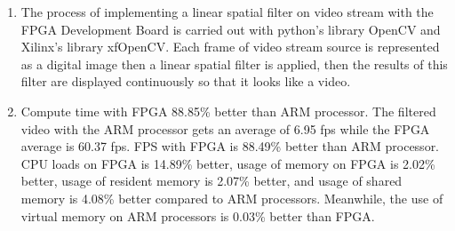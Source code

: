 \begin{enumerate}[topsep=0pt,itemsep=0pt,partopsep=0pt, parsep=0pt]

    \item The process of implementing a linear spatial filter on video stream with the FPGA Development Board is carried out with python's library OpenCV and Xilinx's library xfOpenCV. Each frame of video stream source is represented as a digital image then a linear spatial filter is applied, then the results of this filter are displayed continuously so that it looks like a video.


    \item Compute time with FPGA 88.85\% better than ARM processor. The filtered video with the ARM processor gets an average of 6.95 fps while the FPGA average is 60.37 fps. FPS with FPGA is 88.49\% better than ARM processor. CPU loads on FPGA is 14.89\% better, usage of memory on FPGA is 2.02\% better, usage of resident memory is 2.07\% better, and usage of shared memory is 4.08\% better compared to ARM processors. Meanwhile, the use of virtual memory on ARM processors is 0.03\% better than FPGA.
\end{enumerate}
